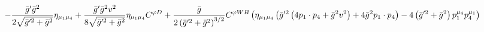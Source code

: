 %
\begin{dmath*}
%
  -  \frac{{\bar g}^\prime {\bar g}{}^2}{2 \sqrt{{\bar g}^{\prime 2} + {\bar g}{}^2}}\eta_{\mu_1 \mu_4}  +  \frac{{\bar g}^\prime {\bar g}{}^2 v^2}{8 \sqrt{{\bar g}^{\prime 2} + {\bar g}{}^2}}\eta_{\mu_1 \mu_4} C^{ \varphi  D}  +  \frac{{\bar g}{}}{2 \left({\bar g}^{\prime 2} + {\bar g}{}^2\right)^{3/2}}C^{ \varphi  WB} \left(\eta_{\mu_1 \mu_4} \left({\bar g}^{\prime 2} \left(4 p_{1}\nobreak\cdot\nobreak{}p_{4} + {\bar g}{}^2 v^2\right) + 4 {\bar g}{}^2 p_{1}\nobreak\cdot\nobreak{}p_{4}\right) - 4 \left({\bar g}^{\prime 2} + {\bar g}{}^2\right) p_1^{\mu_4} p_4^{\mu_1}\right)
%
\end{dmath*}
%
